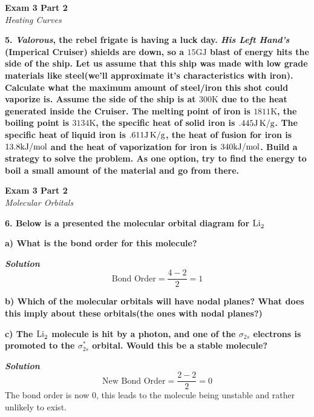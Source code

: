 \documentclass{article}
\begin{document}
    \begin{center}
        \textbf{Exam 3 Part 2}\\
        \textit{Heating Curves}
    \end{center}
    \textbf{5. \textit{Valorous}, the rebel frigate is having a luck day. \textit{His Left Hand's} (Imperical Cruiser) shields are down, so a $15 \si{\giga\joule}$ blast of energy hits the side of the ship. Let us assume that this ship was made with low grade materials like steel(we'll approximate it's characteristics with iron). Calculate what the maximum amount of steel/iron this shot could vaporize is. Assume the side of the ship is at $300 \si{\kelvin}$ due to the heat generated inside the Cruiser. The melting point of iron is $1811 \si{\kelvin}$, the boiling point is $3134 \si{\kelvin}$, the specific heat of solid iron is $.445 \si[per-mode=symbol]{\joule\per\gram\kelvin}$. The specific heat of liquid iron is $.611 \si[per-mode=symbol]{\joule\per\gram\kelvin}$, the heat of fusion for iron is $13.8 \si[per-mode=symbol]{\kilo\joule\per\mole}$ and the heat of vaporization for iron is $340 \si[per-mode=symbol]{\kilo\joule\per\mole}$. Build a strategy to solve the problem. As one option, try to find the energy to boil a small amount of the material and go from there.}
    \pagebreak

    \begin{center}
        \textbf{Exam 3 Part 2}\\
        \textit{Molecular Orbitals}
    \end{center}
    \textbf{6. Below is a presented the molecular orbital diagram for $\ce{Li2}$}

    \textbf{a) What is the bond order for this molecule?}

    \textbf{\textit{Solution}}
    $$\text{Bond Order} = \dfrac{4 - 2}{2} = 1$$

    \textbf{b) Which of the molecular orbitals will have nodal planes? What does this imply about these orbitals(the ones with nodal planes?)}

    \textbf{c) The $\ce{Li2}$ molecule is hit by a photon, and one of the $\sigma_{2s}$ electrons is promoted to the $\sigma_{2s}^{*}$ orbital. Would this be a stable molecule? }

    \textbf{\textit{Solution}}
    $$\text{New Bond Order} = \dfrac{2 - 2}{2} = 0$$
    The bond order is now 0, this leads to the molecule being unstable and rather unlikely to exist.
\end{document}
